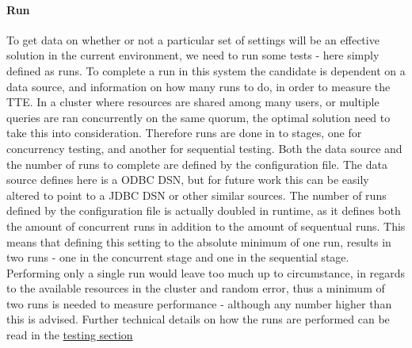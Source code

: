 \documentclass[a4paper,english]{report}
\begin{document}
		\paragraph{Run}
		To get data on whether or not a particular set of settings will be an effective solution in the current environment, we need to run some tests - here simply defined as runs. To complete a run in this system the candidate is dependent on a data source, and information on how many runs to do, in order to measure the TTE. In a cluster where resources are shared among many users, or multiple queries are ran concurrently on the same quorum, the optimal solution need to take this into consideration. Therefore runs are done in to stages, one for concurrency testing, and another for sequential testing. Both the data source and the number of runs to complete are defined by the configuration file. The data source defines here is a ODBC DSN, but for future work this can be easily altered to point to a JDBC DSN or other similar sources. The number of runs defined by the configuration file is actually doubled in runtime, as it defines both the amount of concurrent runs in addition to the amount of sequentual runs. This means that defining this setting to the absolute minimum of one run, results in two runs - one in the concurrent stage and one in the sequential stage. Performing only a single run would leave too much up to circumstance, in regards to the available resources in the cluster and random error, thus a minimum of two runs is needed to measure performance - although any number higher than this is advised. Further technical details on how the runs are performed can be read in the \hyperref[testing]{testing section}
		
\end{document}
